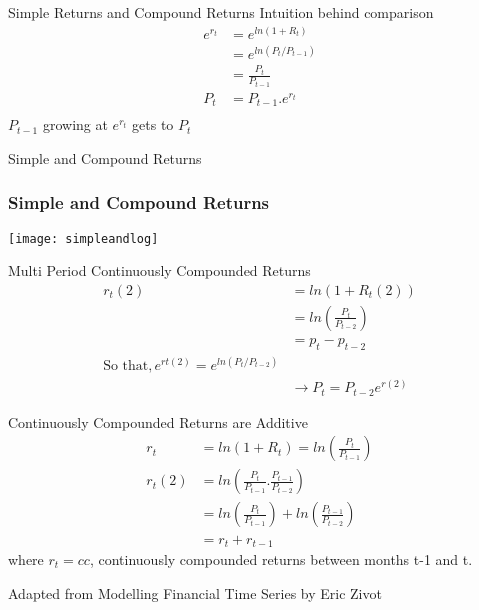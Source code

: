 \documentclass[14pt,xcolor=pdftex,dvipsnames,table]{beamer}
\begin{document}
\begin{frame}{Simple Returns and Compound Returns}
Intuition behind comparison
\begin{align*}
e^{r_t}&=e^{ln(1+R_t)}\\ 
&=e^{ln(P_t/P_{t-1})} \\
&= \frac{P_t}{P_{t-1}}\\
P_t &= P_{t-1}.e^{r_t}\\
\end{align*}
$P_{t-1}$ growing at $e^{r_t}$ gets to $P_t$
\end{frame}

\begin{frame}{Simple and Compound Returns}
\frametitle{Simple and Compound Returns}
\begin{center}
\texttt{[image: simpleandlog]}
\end{center}
\end{frame} 

\begin{frame}{Multi Period Continuously Compounded Returns}
\begin{align*}
r_t(2) &= ln(1 + R_t(2))\\
&= ln \left ( \frac{P_t}{P_{t-2}} \right ) \\
&=p_t - p_{t-2}\\
\text{So that}, e^{rt(2)} = e^{ln(P_t/P_{t-2})}\\
& \rightarrow P_t = P_{t-2}e^{r(2)} 
\end{align*}
\end{frame}

\begin{frame}{Continuously Compounded Returns are Additive} 
\begin{align*}
r_t &= ln (1 + R_t) = ln \left ( \frac{P_t}{P_{t-1}} \right)\\
r_t(2) & = ln \left (\frac{P_t}{P_{t-1}}.\frac{P_{t-1}}{P_{t-2}} \right ) \\
& = ln \left ( \frac{P_t}{P_{t-1}} \right ) +  ln \left ( \frac{P_{t-1}}{P_{t-2}} \right ) \\
& = r_t + r_{t-1}
\end{align*}  
where $r_t = cc$, continuously compounded returns between months t-1 and t. 
\end{frame}



\begin{frame}
Adapted from Modelling Financial Time Series by Eric Zivot
\end{frame}
\end{document}
